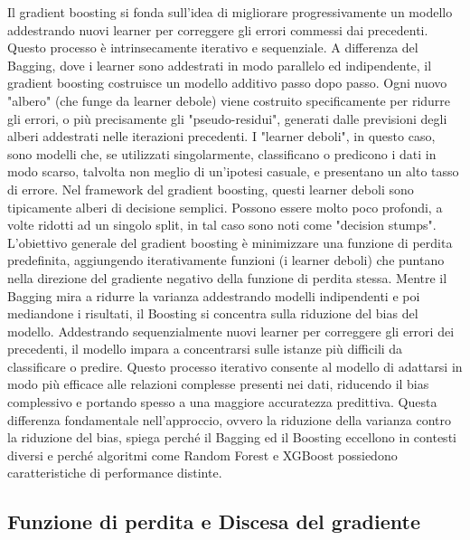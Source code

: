 \documentclass[a4paper,12pt]{report}
\begin{document}
	Il gradient boosting si fonda sull'idea di migliorare progressivamente un modello addestrando nuovi learner per correggere gli errori commessi dai precedenti. Questo processo è intrinsecamente iterativo e sequenziale. A differenza del Bagging, dove i learner sono addestrati in modo parallelo ed indipendente, il gradient boosting costruisce un modello additivo passo dopo passo. Ogni nuovo "albero" (che funge da learner debole) viene costruito specificamente per ridurre gli errori, o più precisamente gli "pseudo-residui", generati dalle previsioni degli alberi addestrati nelle iterazioni precedenti.
	I "learner deboli", in questo caso, sono modelli che, se utilizzati singolarmente, classificano o predicono i dati in modo scarso, talvolta non meglio di un'ipotesi casuale, e presentano un alto tasso di errore. Nel framework del gradient boosting, questi learner deboli sono tipicamente alberi di decisione semplici. Possono essere molto poco profondi, a volte ridotti ad un singolo split, in tal caso sono noti come "decision stumps". L'obiettivo generale del gradient boosting è minimizzare una funzione di perdita predefinita, aggiungendo iterativamente funzioni (i learner deboli) che puntano nella direzione del gradiente negativo della funzione di perdita stessa.
	Mentre il Bagging mira a ridurre la varianza addestrando modelli indipendenti e poi mediandone i risultati, il Boosting si concentra sulla riduzione del bias del modello. Addestrando sequenzialmente nuovi learner per correggere gli errori dei precedenti, il modello impara a concentrarsi sulle istanze più difficili da classificare o predire. Questo processo iterativo consente al modello di adattarsi in modo più efficace alle relazioni complesse presenti nei dati, riducendo il bias complessivo e portando spesso a una maggiore accuratezza predittiva. Questa differenza fondamentale nell'approccio, ovvero la riduzione della varianza contro la riduzione del bias, spiega perché il Bagging ed il Boosting eccellono in contesti diversi e perché algoritmi come Random Forest e XGBoost possiedono caratteristiche di performance distinte.
	
	\subsection{Funzione di perdita e Discesa del gradiente}
	
\end{document}
